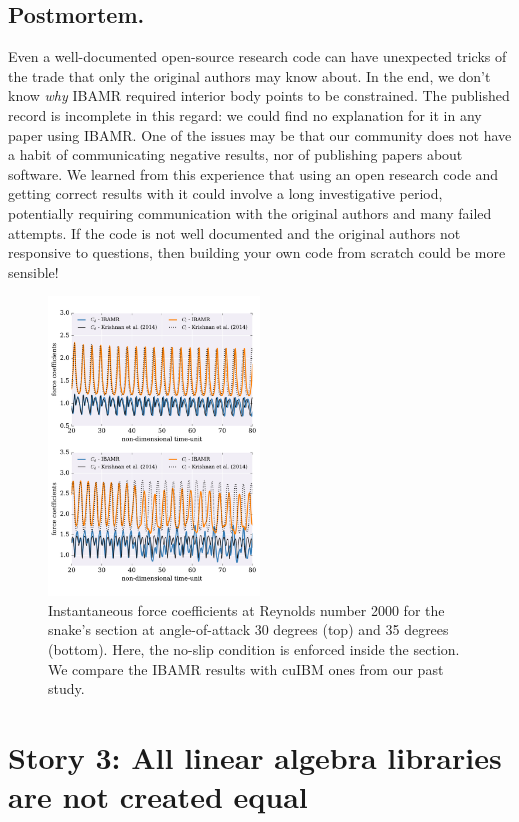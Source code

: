 \documentclass[9pt,twocolumn,twoside]{article}
\begin{document}
\subsection*{Postmortem.} 
Even a well-documented open-source research code can have unexpected tricks of the trade that only the original authors may know about. 
In the end, we don't know \textit{why} IBAMR required interior body points to be constrained. 
The published record is incomplete in this regard: we could find no explanation for it in any paper using IBAMR. 
One of the issues may be that our community does not have a habit of communicating negative results, nor of publishing papers about software. 
We learned from this experience that using an open research code and getting correct results with it could involve a long investigative period, potentially requiring communication with the original authors and many failed attempts. 
If the code is not well documented and the original authors not responsive to questions, then building your own code from scratch could be more sensible!


\begin{figure}[t]
\centering
\includegraphics[width=0.5\textwidth]{./figures/ibamr_forceCoefficientsRe2000.pdf}
\caption{
Instantaneous force coefficients at Reynolds number 2000 for the snake's section at angle-of-attack 30 degrees (top) and 35 degrees (bottom).
Here, the no-slip condition is enforced inside the section.
We compare the IBAMR results with cuIBM ones from our past study.}
\label{figure7}
\end{figure}



\section*{Story 3: All linear algebra libraries are not created equal}
\end{document}
